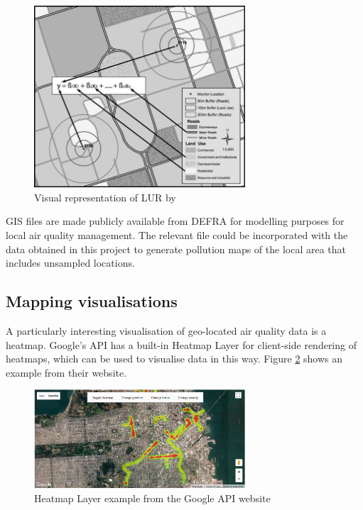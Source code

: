 \documentclass[11pt]{report}
\begin{document}
\begin{figure}[!htb]
\centering
\includegraphics[width=0.7\textwidth]{LURexplanation}
\caption{Visual representation of LUR by \cite{Jerrett2005evalmapmodels}}
\label{LURexplanation}
\end{figure}

GIS files are made publicly available from DEFRA for modelling purposes for local air quality management. The relevant file could be incorporated with the data obtained in this project to generate pollution maps of the local area that includes unsampled locations.


\subsection{Mapping visualisations}

A particularly interesting visualisation of geo-located air quality data is a heatmap. Google's API has a built-in Heatmap Layer for client-side rendering of heatmaps, which can be used to visualise data in this way. Figure \ref{heatmap} shows an example from their website. 


\begin{figure}[!htb]
\centering
\includegraphics[width=0.7\textwidth]{googleapi_heatmap_layer}
\caption{Heatmap Layer example from the Google API website \citep{google2018heatmap}}
\label{heatmap}
\end{figure}
\end{document}
